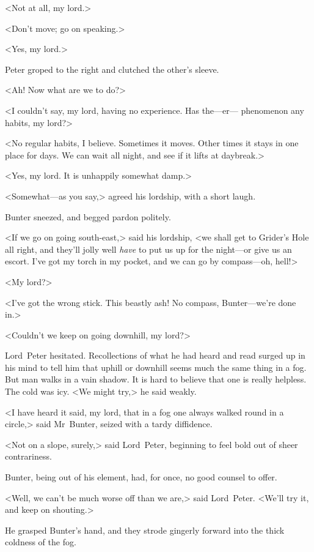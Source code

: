 <Not at all, my lord.>

<Don't move; go on speaking.>

<Yes, my lord.>

Peter groped to the right and clutched the other's sleeve.

<Ah! Now what are we to do?>

<I couldn't say, my lord, having no experience. Has the—er— phenomenon any habits, my lord?>


<No regular habits, I believe. Sometimes it moves. Other times it stays in one place for days. We can wait all night, and see if it lifts at daybreak.>

<Yes, my lord. It is unhappily somewhat damp.>

<Somewhat—as you say,> agreed his lordship, with a short laugh.

Bunter sneezed, and begged pardon politely.

<If we go on going south-east,> said his lordship, <we shall get to Grider's Hole all right, and they'll jolly well \emph{have} to put us up for the night—or give us an escort. I've got my torch in my pocket, and we can go by compass—oh, hell!>

<My lord?>

<I've got the wrong stick. This beastly ash! No compass, Bunter—we're done in.>

<Couldn't we keep on going downhill, my lord?>

Lord~Peter hesitated. Recollections of what he had heard and read surged up in his mind to tell him that uphill or downhill seems much the same thing in a fog. But man walks in a vain shadow. It is hard to believe that one is really helpless. The cold was icy. <We might try,> he said weakly.

<I have heard it said, my lord, that in a fog one always walked round in a circle,> said Mr~Bunter, seized with a tardy diffidence.

<Not on a slope, surely,> said Lord~Peter, beginning to feel bold out of sheer contrariness.

Bunter, being out of his element, had, for once, no good counsel to offer.

<Well, we can't be much worse off than we are,> said Lord~Peter. <We'll try it, and keep on shouting.>

He grasped Bunter's hand, and they strode gingerly forward into the thick coldness of the fog.

